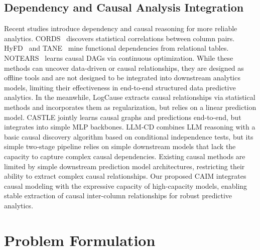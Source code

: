 \documentclass[sigconf, nonacm]{acmart}
\newcommand{\syfix}[1]{{\color{black}#1}}
\newcommand{\syne}[1]{{\color{black}#1}}
\newcommand{\vldb}[1]{{\color{red}#1}}
\newcommand*{\ourmodel}{CAIM}
\begin{document}
\subsection{\vldb{Dependency} and Causal Analysis Integration}
Recent studies introduce \vldb{dependency and} causal reasoning for more reliable \vldb{analytics}\cite{r:causalgraphdb,r:causumx,r:fdx}.
\vldb{
CORDS~\cite{r:cords} discovers statistical correlations between column pairs. HyFD~\cite{r:hyfd} and TANE~\cite{r:tane} mine functional dependencies from relational tables. NOTEARS~\cite{notears} learns causal DAGs via continuous optimization. While these methods can uncover data-driven or causal relationships, they are designed as offline tools and are not designed to be integrated into downstream analytics models, limiting their effectiveness in end-to-end structured data predictive analytics.
}
In the meanwhile, LogCause \cite{r:linear} extracts causal relationships via statistical methods and incorporates them as regularization, but relies on a linear prediction model. 
CASTLE \cite{r:CASTLE} jointly learns causal graphs and predictions end-to-end, but \vldb{integrates} into simple MLP backbones. \syfix{
LLM‑CD \cite{r:llmcd} combines LLM reasoning with a basic causal discovery algorithm based on conditional independence tests, 
but its \syne{simple} two‑stage pipeline relies on \vldb{simple downstream models} that lack the capacity to capture complex causal dependencies.
} 
Existing causal methods are limited by simple \vldb{downstream prediction model architectures}, restricting their ability to extract complex causal relationships.
\vldb{Our proposed \ourmodel{} integrates causal modeling with the expressive capacity of high-capacity models,} 
enabling stable extraction of causal inter-column relationships for robust \vldb{predictive analytics}.

\section{Problem Formulation}
\end{document}
